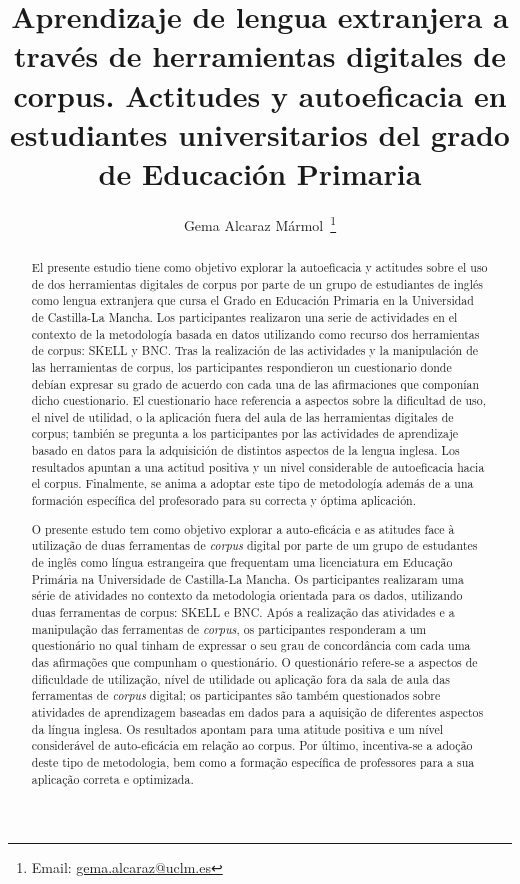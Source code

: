\documentclass[spanish]{textolivre}
\title{Aprendizaje de lengua extranjera a través de herramientas digitales de corpus. Actitudes y autoeficacia en estudiantes universitarios del grado de Educación Primaria}
\author[1]{Gema Alcaraz Mármol~\orcid{0000-0001-7703-3829}\thanks{Email: \href{mailto:gema.alcaraz@uclm.es}{gema.alcaraz@uclm.es}}}
\affil[1]{Universidad de Castilla-La Mancha,  Departamento de Filología Moderna, Toledo, España.}
\begin{document}
\maketitle
\begin{polyabstract}
\begin{abstract}
El presente estudio tiene como objetivo explorar la
autoeficacia y actitudes sobre el uso de dos herramientas digitales de
corpus por parte de un grupo de estudiantes de inglés como lengua
extranjera que cursa el Grado en Educación Primaria en la Universidad de
Castilla-La Mancha. Los participantes realizaron una serie de
actividades en el contexto de la metodología basada en datos utilizando
como recurso dos herramientas de corpus: SKELL y BNC. Tras la
realización de las actividades y la manipulación de las herramientas de
corpus, los participantes respondieron un cuestionario donde debían
expresar su grado de acuerdo con cada una de las afirmaciones que
componían dicho cuestionario. El cuestionario hace referencia a aspectos
sobre la dificultad de uso, el nivel de utilidad, o la aplicación fuera
del aula de las herramientas digitales de corpus; también se pregunta a
los participantes por las actividades de aprendizaje basado en datos
para la adquisición de distintos aspectos de la lengua inglesa. Los
resultados apuntan a una actitud positiva y un nivel considerable de
autoeficacia hacia el corpus. Finalmente, se anima a adoptar este tipo
de metodología además de a una formación específica del profesorado para
su correcta y óptima aplicación.

\end{abstract}

\begin{portuguese}
\begin{abstract}
O presente estudo tem como objetivo explorar a auto-eficácia e
as atitudes face à utilização de duas ferramentas de \textit{corpus} digital por parte de um grupo de estudantes de inglês como língua estrangeira que
frequentam uma licenciatura em Educação Primária na Universidade de
Castilla-La Mancha. Os participantes realizaram uma série de atividades
no contexto da metodologia orientada para os dados, utilizando duas
ferramentas de corpus: SKELL e BNC. Após a realização das atividades e
a manipulação das ferramentas de \textit{corpus}, os participantes responderam a um questionário no qual tinham de expressar o seu grau de concordância com cada uma das afirmações que compunham o questionário. O questionário refere-se a aspectos de dificuldade de utilização, nível de utilidade ou aplicação fora da sala de aula das ferramentas de \textit{corpus} digital; os participantes são também questionados sobre atividades de aprendizagem baseadas em dados para a aquisição de diferentes aspectos da língua inglesa. Os resultados apontam para uma atitude positiva e um nível considerável de auto-eficácia em relação ao corpus. Por último,
incentiva-se a adoção deste tipo de metodologia, bem como a formação
específica de professores para a sua aplicação correta e optimizada.


\end{abstract}
\end{portuguese}
\end{polyabstract}
\end{document}
